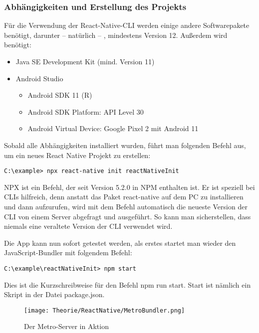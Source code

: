 \subsubsection{Abhängigkeiten und Erstellung des Projekts}
Für die Verwendung der React-Native-CLI werden einige andere Softwarepakete benötigt, darunter --
natürlich -- , mindestens Version 12. Außerdem wird benötigt:

\begin{itemize}
  \item Java SE Development Kit (mind. Version 11)
  \item Android Studio
  \begin{itemize}
    \item Android SDK 11 (R)
    \item Android SDK Platform: API Level 30
    \item Android Virtual Device: Google Pixel 2 mit Android 11
  \end{itemize}
\end{itemize}

Sobald alle Abhängigkeiten installiert wurden, führt man folgenden Befehl aus, um ein neues React
Native Projekt zu erstellen:

\begin{lstlisting}
C:\example> npx react-native init reactNativeInit
\end{lstlisting}

NPX ist ein Befehl, der seit Version 5.2.0 in NPM enthalten ist. Er ist speziell bei CLIs hilfreich,
denn anstatt das Paket react-native auf dem PC zu installieren und dann aufzurufen, wird mit dem
Befehl automatisch die neueste Version der CLI von einem Server abgefragt und ausgeführt. So kann
man sicherstellen, dass niemals eine veraltete Version der CLI verwendet wird.

Die App kann nun sofort getestet werden, als erstes startet man wieder den JavaScript-Bundler
 mit folgendem Befehl:

\begin{lstlisting}
C:\example\reactNativeInit> npm start
\end{lstlisting}

Dies ist die Kurzschreibweise für den Befehl npm run start. Start ist nämlich ein Skript in der
Datei package.json.

\begin{figure}[H]
  \begin{center}
    \texttt{[image: Theorie/ReactNative/MetroBundler.png]}
    \caption{Der Metro-Server in Aktion}
  \end{center}
\end{figure}

